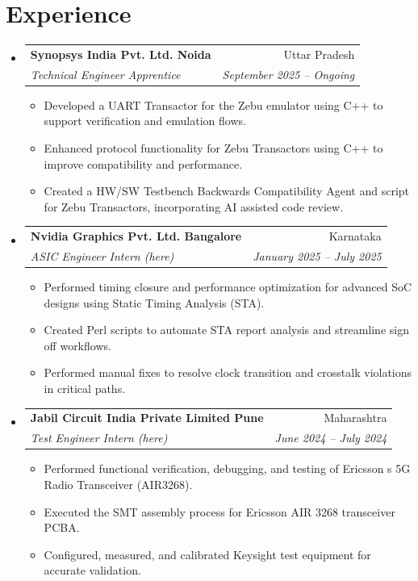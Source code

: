 \documentclass[letterpaper,11pt]{article}
\makeatletter
\newcommand{\resumeItem}[1]{\item\small{#1 \vspace{-2pt}}}
\newcommand{\resumeSubheading}[4]{
  \vspace{-2pt}\item
    \begin{tabular*}{\textwidth}[t]{l@{\extracolsep{\fill}}r}
      \textbf{#1} & #2 \\
      \textit{\small#3} & \textit{\small #4} \\
    \end{tabular*}\vspace{-7pt}
}
\newcommand{\resumeSubHeadingListStart}{\begin{itemize}[leftmargin=0.15in, label={}]}
\newcommand{\resumeSubHeadingListEnd}{\end{itemize}}
\newcommand{\resumeItemListStart}{\begin{itemize}}
\newcommand{\resumeItemListEnd}{\end{itemize}\vspace{-5pt}}
\makeatother
\begin{document}
\section{Experience}
\resumeSubHeadingListStart
  \resumeSubheading
    { Synopsys India Pvt. Ltd. Noida }{ Uttar Pradesh }
    { Technical Engineer Apprentice }{ September 2025 -- Ongoing }
    \resumeItemListStart
      \resumeItem{ Developed a UART Transactor for the Zebu emulator using C++ to support verification and emulation flows. }
      \resumeItem{ Enhanced protocol functionality for Zebu Transactors using C++ to improve compatibility and performance. }
      \resumeItem{ Created a HW/SW Testbench Backwards Compatibility Agent and script for Zebu Transactors, incorporating AI assisted code review. }
    \resumeItemListEnd
  \resumeSubheading
    { Nvidia Graphics Pvt. Ltd. Bangalore }{ Karnataka }
    { ASIC Engineer Intern (here) }{ January 2025 -- July 2025 }
    \resumeItemListStart
      \resumeItem{ Performed timing closure and performance optimization for advanced SoC designs using Static Timing Analysis (STA). }
      \resumeItem{ Created Perl scripts to automate STA report analysis and streamline sign off workflows. }
      \resumeItem{ Performed manual fixes to resolve clock transition and crosstalk violations in critical paths. }
    \resumeItemListEnd
  \resumeSubheading
    { Jabil Circuit India Private Limited Pune }{ Maharashtra }
    { Test Engineer Intern (here) }{ June 2024 -- July 2024 }
    \resumeItemListStart
      \resumeItem{ Performed functional verification, debugging, and testing of Ericsson s 5G Radio Transceiver (AIR3268). }
      \resumeItem{ Executed the SMT assembly process for Ericsson AIR 3268 transceiver PCBA. }
      \resumeItem{ Configured, measured, and calibrated Keysight test equipment for accurate validation. }
    \resumeItemListEnd
\resumeSubHeadingListEnd
\end{document}
